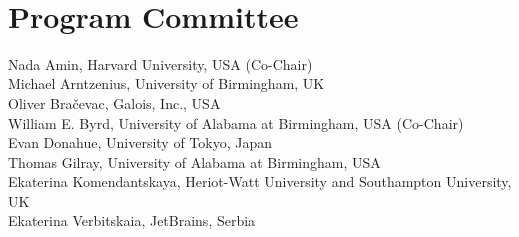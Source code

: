 \documentclass[a4paper]{book}
\begin{document}
\ \\

\section*{Program Committee}
\noindent
Nada Amin, Harvard University, USA (Co-Chair)\\
Michael Arntzenius, University of Birmingham, UK\\
Oliver Bračevac, Galois, Inc., USA\\
William E. Byrd, University of Alabama at Birmingham, USA (Co-Chair)\\
Evan Donahue, University of Tokyo, Japan\\
Thomas Gilray, University of Alabama at Birmingham, USA\\
Ekaterina Komendantskaya, Heriot-Watt University and Southampton University, UK\\
Ekaterina Verbitskaia, JetBrains, Serbia\\

\tableofcontents
\mainmatter
{}



\ \\
\pagebreak



\ \\
\pagebreak



\ \\
\pagebreak



\ \\
\pagebreak
\end{document}

